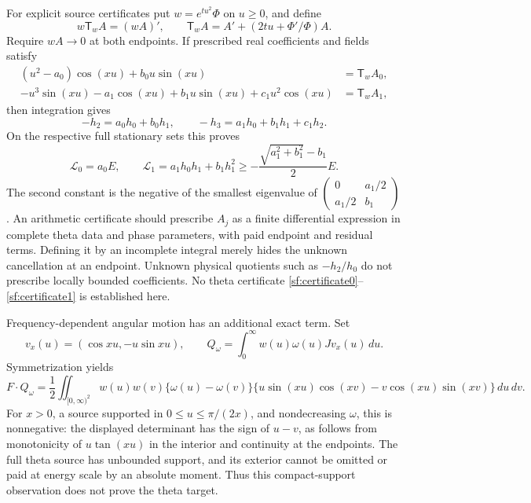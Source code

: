 \documentclass[11pt]{article}
\numberwithin{equation}{section}
\theoremstyle{definition}
\theoremstyle{remark}
\newcommand{\dd}{\,d}
\newcommand{\Lag}{\mathcal L}
\begin{document}
For explicit source certificates put \(w=e^{tu^2}\Phi\) on
\(u\ge0\), and define
\[
 w\mathsf T_wA=(wA)',\qquad
 \mathsf T_wA=A'+(2tu+\Phi'/\Phi)A .
\]
Require \(wA\to0\) at both endpoints.  If prescribed real
coefficients and fields satisfy
\begin{align}
 (u^2-a_0)\cos(xu)+b_0u\sin(xu)
       &=\mathsf T_wA_0,\label{sf:certificate0}\\
 -u^3\sin(xu)-a_1\cos(xu)+b_1u\sin(xu)+c_1u^2\cos(xu)
       &=\mathsf T_wA_1,\label{sf:certificate1}
\end{align}
then integration gives
\[
 -h_2=a_0h_0+b_0h_1,\qquad
 -h_3=a_1h_0+b_1h_1+c_1h_2.
\]
On the respective full stationary sets this proves
\begin{equation}
 \Lag_0=a_0E,\qquad
 \Lag_1=a_1h_0h_1+b_1h_1^2
 \ge-\frac{\sqrt{a_1^2+b_1^2}-b_1}{2}E .
 \label{sf:certificate-losses}
\end{equation}
The second constant is the negative of the smallest eigenvalue of
\(\left(\begin{smallmatrix}0&a_1/2\\a_1/2&b_1\end{smallmatrix}\right)\).
An arithmetic certificate should prescribe \(A_j\) as a finite
differential expression in complete theta data and phase parameters,
with paid endpoint and residual terms.  Defining it by an incomplete
integral merely hides the unknown cancellation at an endpoint.
Unknown physical quotients such as \(-h_2/h_0\) do not prescribe
locally bounded coefficients.  No theta certificate
\eqref{sf:certificate0}--\eqref{sf:certificate1} is established here.

Frequency-dependent angular motion has an additional exact term.
Set
\[
 v_x(u)=(\cos xu,-u\sin xu),\qquad
 Q_\omega=\int_0^\infty w(u)\omega(u)Jv_x(u)\dd u.
\]
Symmetrization yields
\begin{equation}
 F\cdot Q_\omega=\frac12\iint_{[0,\infty)^2}
 w(u)w(v)\{\omega(u)-\omega(v)\}
 \{u\sin(xu)\cos(xv)-v\cos(xu)\sin(xv)\}\dd u\dd v .
 \label{sf:angular-commutator}
\end{equation}
For \(x>0\), a source supported in \(0\le u\le\pi/(2x)\), and
nondecreasing \(\omega\), this is nonnegative: the displayed
determinant has the sign of \(u-v\), as follows from monotonicity of
\(u\tan(xu)\) in the interior and continuity at the endpoints.
The full theta source has unbounded support, and its exterior cannot
be omitted or paid at energy scale by an absolute moment.  Thus this
compact-support observation does not prove the theta target.
\end{document}
